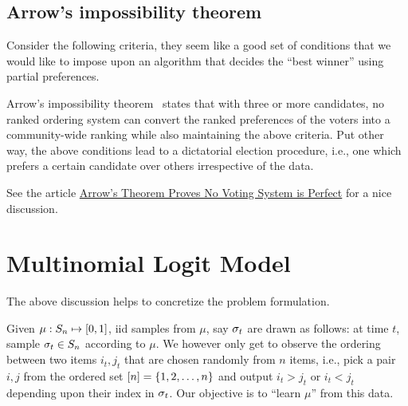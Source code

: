 \documentclass[letterpaper, 12pt, reqno]{amsart}
\begin{document}
\subsection{Arrow's impossibility theorem}
Consider the following criteria, they seem like a good set of conditions that we would like to impose upon an algorithm that decides the ``best winner'' using partial preferences.

Arrow's impossibility theorem~\cite{arrow2012social} states that with three or more candidates, no ranked ordering system can convert the ranked preferences of the voters into a community-wide ranking while also maintaining the above criteria. Put other way, the above conditions lead to a dictatorial election procedure, i.e., one which prefers a certain candidate over others irrespective of the data.

See the article \href{http://tech.mit.edu/V123/N8/8voting.8n.html}{Arrow's Theorem Proves No Voting System is Perfect} for a nice discussion.

\section{Multinomial Logit Model}

The above discussion helps to concretize the problem formulation.

\begin{problem}
Given $\mu: S_n \mapsto [0,1]$, iid samples from $\mu$, say $\sigma_t$ are drawn as follows: at time $t$, sample $\sigma_t \in S_n$ according to $\mu$. We however only get to observe the ordering between two items $i_t, j_t$ that are chosen randomly from $n$ items, i.e., pick a pair $i, j$ from the ordered set $[n] = \{1, 2, \ldots, n\}$ and output $i_t > j_t$ or $i_t < j_t$ depending upon their index in $\sigma_t$. Our objective is to ``learn $\mu$'' from this data.
\end{problem}
\end{document}
